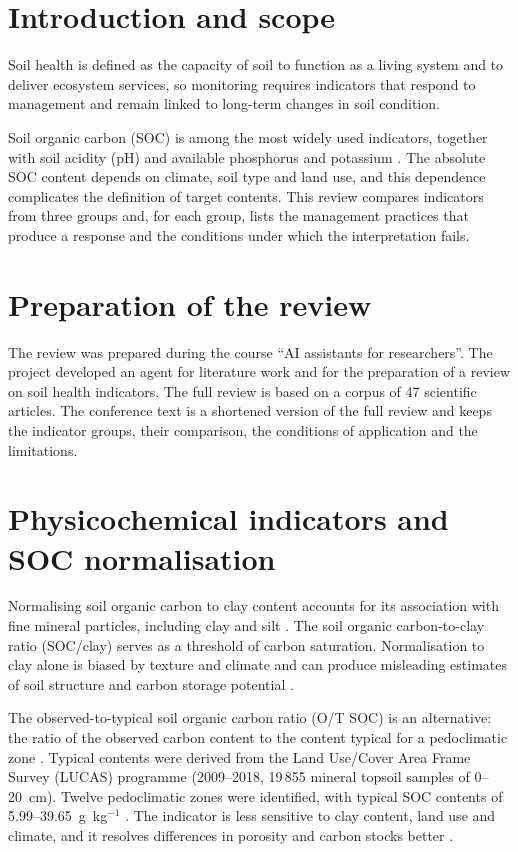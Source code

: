 \documentclass[english]{ai4science_ysda}
\begin{document}
\section*{Introduction and scope}

\porozhdeno{} Soil health is defined as the capacity of soil to function as a living system
and to deliver ecosystem services, so monitoring requires indicators that
respond to management and remain linked to long-term changes in soil condition.

Soil organic carbon (SOC) is among the most widely used indicators, together
with soil acidity (pH) and available phosphorus and potassium \cite{bunemann2018}.
The absolute SOC content depends on climate, soil type and land use, and this
dependence complicates the definition of target contents. This review compares
indicators from three groups and, for each group, lists the management practices
that produce a response and the conditions under which the interpretation fails.

\section{Preparation of the review}

\porozhdeno{} The review was prepared during the course ``AI assistants for
researchers''. The project developed an agent for literature work and for the
preparation of a review on soil health indicators. The full review is based on a
corpus of 47 scientific articles. The conference text is a shortened version of
the full review and keeps the indicator groups, their comparison, the conditions
of application and the limitations.



\section{Physicochemical indicators and SOC normalisation}

\porozhdeno{} Normalising soil organic carbon to clay content accounts for its
association with fine mineral particles, including clay and silt
\cite{feeney2024}. The soil organic
carbon-to-clay ratio (SOC/clay) serves as a threshold of carbon saturation.
Normalisation to clay alone is biased by texture and climate and can produce
misleading estimates of soil structure and carbon storage potential
\cite{feeney2024}.

The observed-to-typical soil organic carbon ratio (O/T SOC) is an alternative:
the ratio of the observed carbon content to the content typical for a
pedoclimatic zone \cite{feeney2024}. Typical contents were derived from the Land
Use/Cover Area Frame Survey (LUCAS) programme (2009--2018, 19\,855 mineral
topsoil samples of 0--20~cm). Twelve pedoclimatic zones were identified, with
typical SOC contents of 5.99--39.65~g~kg$^{-1}$ \cite{feeney2024}. The indicator
is less sensitive to clay content, land use and climate, and it resolves
differences in porosity and carbon stocks better \cite{feeney2024}.
\end{document}
